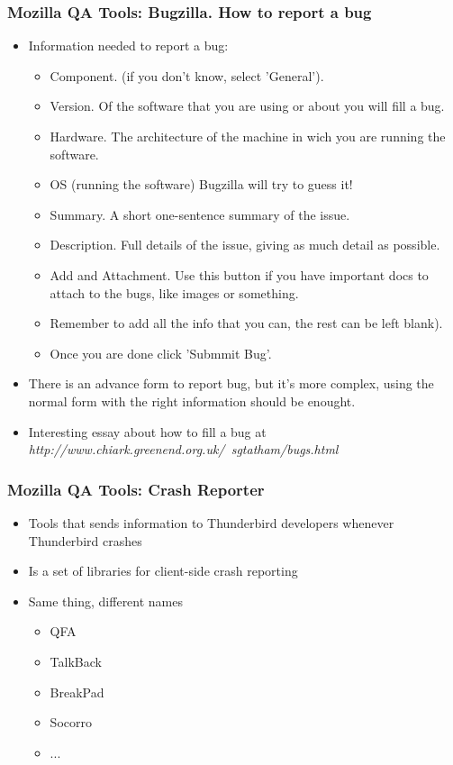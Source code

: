 \documentclass{beamer}
\begin{document}
\begin{frame}
 \frametitle{Mozilla QA Tools: Bugzilla. How to report a bug}
 \begin{itemize}
    \item Information needed to report a bug:
    \begin{itemize}
      \item Component. (if you don't know, select 'General').
      \item Version. Of the software that you are using or about you will fill a bug.
      \item Hardware. The architecture of the machine in wich you are running the software.
      \item OS (running the software) Bugzilla will try to guess it!
      \item Summary. A short one-sentence summary of the issue.
      \item Description. Full details of the issue, giving as much detail as possible.
      \item Add and Attachment. Use this button if you have important docs to attach to the bugs, like images or something.
      \item Remember to add all the info that you can, the rest can be left blank).
      \item Once you are done click 'Submmit Bug'.
      \end{itemize}
     \item There is an advance form to report  bug, but it's more complex, using the normal form with the right information should be enought.
     \item Interesting essay about how to fill a bug at \textit{http://www.chiark.greenend.org.uk/~sgtatham/bugs.html}
 \end{itemize}
\end{frame}


\begin{frame}
 \frametitle{Mozilla QA Tools: Crash Reporter}
 \begin{itemize}
 \item Tools that sends information to Thunderbird developers whenever Thunderbird crashes
 \item Is a set of libraries for client-side crash reporting
 \item Same thing, different names
    \begin{itemize}
     \item QFA
     \item TalkBack
     \item BreakPad
     \item Socorro
     \item ...
    \end{itemize}
 \end{itemize}
\end{frame}
\end{document}
